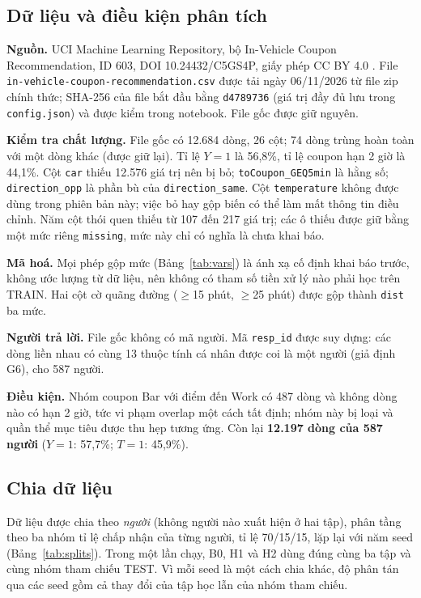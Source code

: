 \documentclass[pdflatex,sn-mathphys-num]{sn-jnl}%
\newcommand{\var}[1]{\texttt{#1}}                 %
\begin{document}
\subsection{Dữ liệu và điều kiện phân tích}\label{sec:data}

\textbf{Nguồn.} UCI Machine Learning Repository, bộ In-Vehicle Coupon Recommendation, ID 603, DOI 10.24432/C5GS4P, giấy phép CC BY 4.0 \cite{uci603}. File \texttt{in-vehicle-coupon-recommendation.csv} được tải ngày 06/11/2026 từ file zip chính thức; SHA-256 của file bắt đầu bằng \texttt{d4789736} (giá trị đầy đủ lưu trong \texttt{config.json}) và được kiểm trong notebook. File gốc được giữ nguyên.

\textbf{Kiểm tra chất lượng.} File gốc có 12.684 dòng, 26 cột; 74 dòng trùng hoàn toàn với một dòng khác (được giữ lại). Tỉ lệ $Y=1$ là 56,8\%, tỉ lệ coupon hạn 2 giờ là 44,1\%. Cột \var{car} thiếu 12.576 giá trị nên bị bỏ; \var{toCoupon\_GEQ5min} là hằng số; \var{direction\_opp} là phần bù của \var{direction\_same}. Cột \var{temperature} không được dùng trong phiên bản này; việc bỏ hay gộp biến có thể làm mất thông tin điều chỉnh. Năm cột thói quen thiếu từ 107 đến 217 giá trị; các ô thiếu được giữ bằng một mức riêng \var{missing}, mức này chỉ có nghĩa là chưa khai báo.

\textbf{Mã hoá.} Mọi phép gộp mức (Bảng~\ref{tab:vars}) là ánh xạ cố định khai báo trước, không ước lượng từ dữ liệu, nên không có tham số tiền xử lý nào phải học trên TRAIN. Hai cột cờ quãng đường ($\ge$15 phút, $\ge$25 phút) được gộp thành \var{dist} ba mức.

\textbf{Người trả lời.} File gốc không có mã người. Mã \var{resp\_id} được suy dựng: các dòng liền nhau có cùng 13 thuộc tính cá nhân được coi là một người (giả định G6), cho 587 người.

\textbf{Điều kiện.} Nhóm coupon Bar với điểm đến Work có 487 dòng và không dòng nào có hạn 2 giờ, tức vi phạm overlap một cách tất định; nhóm này bị loại và quần thể mục tiêu được thu hẹp tương ứng. Còn lại \textbf{12.197 dòng của 587 người} ($Y=1$: 57,7\%; $T=1$: 45,9\%).

\subsection{Chia dữ liệu}

Dữ liệu được chia theo \emph{người} (không người nào xuất hiện ở hai tập), phân tầng theo ba nhóm tỉ lệ chấp nhận của từng người, tỉ lệ 70/15/15, lặp lại với năm seed (Bảng~\ref{tab:splits}). Trong một lần chạy, B0, H1 và H2 dùng đúng cùng ba tập và cùng nhóm tham chiếu TEST. Vì mỗi seed là một cách chia khác, độ phân tán qua các seed gồm cả thay đổi của tập học lẫn của nhóm tham chiếu.
\end{document}
